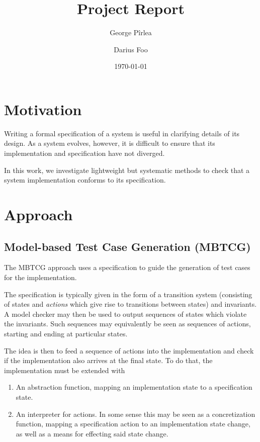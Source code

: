 \documentclass[a4paper]{article}
\title{Project Report}
\author{George Pîrlea \and Darius Foo}
\date{\today}
\begin{document}
\maketitle

\section{Motivation}

Writing a formal specification of a system is useful in clarifying details of its design. As a system evolves, however, it is difficult to ensure that its implementation and specification have not diverged.

In this work, we investigate lightweight but systematic methods to check that a system implementation conforms to its specification.

\section{Approach}

\subsection{Model-based Test Case Generation (MBTCG)}

The MBTCG approach uses a specification to guide the generation of test cases for the implementation.

The specification is typically given in the form of a transition system (consisting of states and \emph{actions} which give rise to transitions between states) and invariants. A model checker may then be used to output sequences of states which violate the invariants. Such sequences may equivalently be seen as sequences of actions, starting and ending at particular states.

The idea is then to feed a sequence of actions into the implementation and check if the implementation also arrives at the final state. To do that, the implementation must be extended with

\begin{enumerate}
\item An abstraction function, mapping an implementation state to a specification state.
\item An interpreter for actions. In some sense this may be seen as a concretization function, mapping a specification action to an implementation state change, as well as a means for effecting said state change.
\end{enumerate}
\end{document}
